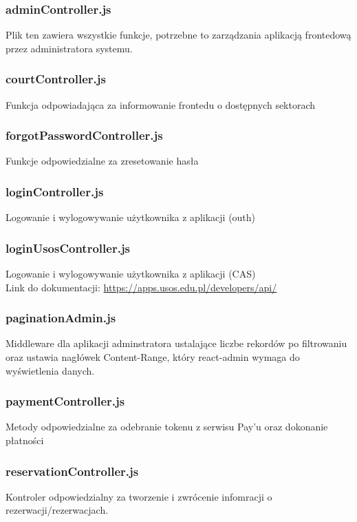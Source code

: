 \documentclass[titlepage]{article}
\begin{document}
\subsubsection{adminController.js}
Plik ten zawiera wszystkie funkcje, potrzebne to zarządzania aplikacją frontedową przez administratora systemu. 

\subsubsection{courtController.js}
Funkcja odpowiadająca za informowanie frontedu o dostępnych sektorach

\subsubsection{forgotPasswordController.js}
Funkcje odpowiedzialne za zresetowanie hasła

\subsubsection{loginController.js}
Logowanie i wylogowywanie użytkownika z aplikacji (outh)

\subsubsection{loginUsosController.js}
Logowanie i wylogowywanie użytkownika z aplikacji (CAS) \\
Link do dokumentacji: \url{https://apps.usos.edu.pl/developers/api/}

\subsubsection{paginationAdmin.js}
Middleware dla aplikacji adminstratora ustalające liczbe rekordów po filtrowaniu oraz ustawia nagłówek Content-Range, który react-admin wymaga do wyświetlenia danych.

\subsubsection{paymentController.js}
Metody odpowiedzialne za odebranie tokenu z serwisu Pay'u oraz dokonanie płatności

\subsubsection{reservationController.js}
Kontroler odpowiedzialny za tworzenie i zwrócenie infomracji o rezerwacji/rezerwacjach.
\end{document}
